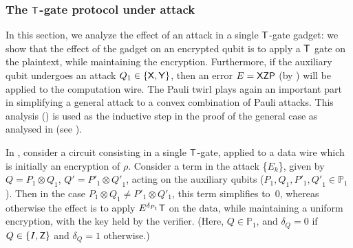 \documentclass{toc}
\newcommand{\pgate}{{\sf P}}
\newcommand{\tgate}{{\sf T}}
\newcommand{\xgate}{{\sf X}}
\newcommand{\ygate}{{\sf Y}}
\newcommand{\zgate}{{\sf Z}}
\begin{document}
\subsubsection{The \texorpdfstring{$\tgate$}{T}-gate protocol under attack}
\label{sec:soundness-T-gate-Paulis}

In this section, we  analyze the effect of an attack in a single
$\tgate$-gate gadget: we show that the effect of the gadget on an encrypted qubit is to apply a $\tgate$ gate on the plaintext, while maintaining the encryption. Furthermore, if the auxiliary qubit undergoes an attack $Q_1 \in \{\xgate, \ygate\}$, then an error $E=\xgate\zgate\pgate$ (by ) will be applied to the computation wire. The Pauli twirl plays again an important part in simplifying a general attack to a convex combination of Pauli attacks.
This analysis () is used as the inductive step in the proof of the general case as analysed in  (see ).


\begin{lemma}
\label{lem:single-t-gate}
In , consider a circuit consisting in a
single $\tgate$-gate, applied to a data wire which is initially an encryption of $\rho$. Consider a term in the attack \{$E_k$\}, given by $Q=P_1\otimes Q_1$, $Q' = {P'}_1 \otimes {Q'}_1$, acting on the auxiliary qubits ($P_1, Q_1, {P'}_1, {Q'}_1 \in \mathbb{P}_1$).  Then in the case $P_1\otimes Q_1 \neq P'_1 \otimes Q'_1$, this term simplifies to~$0$, whereas otherwise the effect is to apply $E^{\delta_{P_1}} \tgate$ on the data, while maintaining a uniform encryption, with the key held by the verifier. (Here,  $Q \in \mathbb{P}_1$, and $\delta_{Q} = 0$ if $Q \in \{I, \zgate\} $ and $\delta_{Q} = 1$ otherwise.)
\end{lemma}
\end{document}
